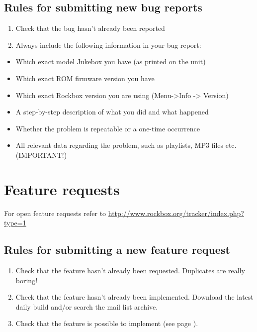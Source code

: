 \subsection{Rules for submitting new bug reports}

\begin{enumerate}
\item  Check that the bug hasn't already been reported
\item  Always include the following information in your bug report:
\end{enumerate}

\begin{itemize}
\item  Which exact model Jukebox you have (as printed on the unit)
\item  Which exact ROM firmware version you have
\item  Which exact Rockbox version you are using
(Menu{}-{\textgreater}Info {}-{\textgreater} Version)
\item  A step{}-by{}-step description of what you did and what happened
\item  Whether the problem is repeatable or a one{}-time occurrence
\item  All relevant data regarding the problem, such as playlists, MP3
files etc. (IMPORTANT!) 
\end{itemize}

\section{Feature requests}
For open feature requests refer to
\url{http://www.rockbox.org/tracker/index.php?type=1}

\subsection{Rules for submitting a new feature request}

\begin{enumerate}
\item Check that the feature hasn't already been requested. 
  Duplicates are really boring!
\item Check that the feature hasn't already been implemented. 
  Download the latest daily build and/or search the mail list archive.
\item Check that the feature is possible to implement (see page \pageref{ref:NODO}).
\end{enumerate}

